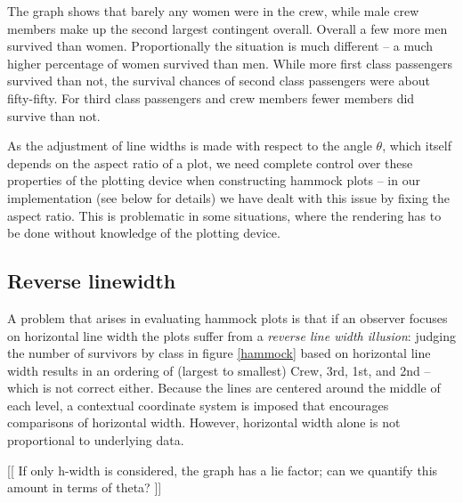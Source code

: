 The graph shows that barely any women were in the crew, while male crew members make up the second largest contingent overall. Overall a few more men survived than women. Proportionally the situation is much different -- a much higher percentage of women survived than men. While more first class passengers survived than not, the  survival chances of second class passengers were about fifty-fifty. For third class passengers and crew members fewer members did  survive than not. 

As the adjustment of line widths is made with respect to the angle $\theta$, which itself depends on the aspect ratio of a plot, we need complete control over these properties of the plotting device when constructing hammock plots  -- in our implementation (see below for details) we have dealt with this issue by fixing the aspect ratio. This is problematic in some situations, where the rendering has to be done without knowledge of the plotting device. 

\subsection{Reverse linewidth}
A problem that arises in evaluating hammock plots is that if an observer focuses on horizontal line width  the plots suffer from a {\it reverse line width illusion}:  judging the number of survivors by class in figure \ref{hammock} based on horizontal line width  results in an ordering of (largest to smallest) Crew, 3rd, 1st, and 2nd -- which is not correct either. %
Because the lines are centered around the middle of each level, a contextual coordinate system is imposed that encourages comparisons of horizontal width. However, horizontal width alone is not proportional to underlying data. 

[[ If only h-width is considered, the graph has a lie factor; can we quantify this amount in terms of theta? ]]
%

